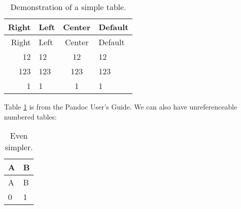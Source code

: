 \begin{longtable}[c]{@{}rlcl@{}}
\caption{Demonstration of a simple
table.\label{tbl:demo}}\tabularnewline
\toprule
Right & Left & Center & Default\tabularnewline
\midrule
\endfirsthead
\toprule
Right & Left & Center & Default\tabularnewline
\midrule
\endhead
12 & 12 & 12 & 12\tabularnewline
123 & 123 & 123 & 123\tabularnewline
1 & 1 & 1 & 1\tabularnewline
\bottomrule
\end{longtable}

Table \ref{tbl:demo} is from the Pandoc User's Guide. We can also have
unreferenceable numbered tables:

\begin{longtable}[c]{@{}ll@{}}
\caption{Even
simpler.\label{tbl:__-1650883463836839502__}}\tabularnewline
\toprule
A & B\tabularnewline
\midrule
\endfirsthead
\toprule
A & B\tabularnewline
\midrule
\endhead
0 & 1\tabularnewline
\bottomrule
\end{longtable}
